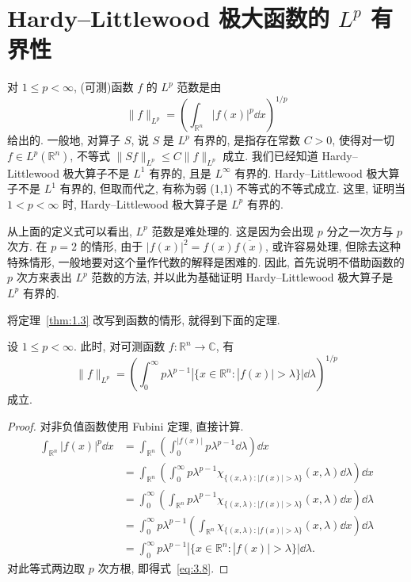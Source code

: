 
\section{\texorpdfstring{Hardy--Littlewood 极大函数的 $L^{p}$ 有界性}{Hardy-Littlewood 极大函数的 Lp 有界性}}\label{sec:3.2}


对 $1 \leq p < \infty$, (可测)函数 $f$ 的 $L^{p}$ 范数是由
\[
\|f\|_{L^{p}} = \left(\int_{\mathbb{R}^{n}}|f(x)|^{p}\dd x\right)^{1/p}
\]
给出的. 一般地, 对算子 $S$, 说 $S$ 是 $L^{p}$ 有界的, 是指存在常数 $C > 0$, 使得对一切 $f \in L^{p}(\mathbb{R}^{n})$, 不等式 $\|Sf\|_{L^{p}} \leq C\|f\|_{L^{p}}$ 成立. 我们已经知道 Hardy--Littlewood 极大算子不是 $L^{1}$ 有界的, 且是 $L^{\infty}$ 有界的. Hardy--Littlewood 极大算子不是 $L^{1}$ 有界的, 但取而代之, 有称为弱 (1,1) 不等式的不等式成立. 这里, 证明当 $1 < p < \infty$ 时, Hardy--Littlewood 极大算子是 $L^{p}$ 有界的.

从上面的定义式可以看出, $L^{p}$ 范数是难处理的. 这是因为会出现 $p$ 分之一次方与 $p$ 次方. 在 $p = 2$ 的情形, 由于 $|f(x)|^{2} = f(x)\overline{f(x)}$, 或许容易处理, 但除去这种特殊情形, 一般地要对这个量作代数的解释是困难的. 因此, 首先说明不借助函数的 $p$ 次方来表出 $L^{p}$ 范数的方法, 并以此为基础证明 Hardy--Littlewood 极大算子是 $L^{p}$ 有界的.

将定理~\ref{thm:1.3} 改写到函数的情形, 就得到下面的定理.

\begin{theorem}\label{thm:3.3}
设 $1 \leq p < \infty$. 此时, 对可测函数 $f: \mathbb{R}^{n} \to \mathbb{C}$, 有
\begin{equation}\tag{3.8}
\|f\|_{L^{p}} = \left(\int_{0}^{\infty}p\lambda^{p-1}|\{x \in \mathbb{R}^{n}: |f(x)| > \lambda\}|\dd\lambda\right)^{1/p}
\label{eq:3.8}
\end{equation}
成立.
\end{theorem}

\begin{proof}
对非负值函数使用 Fubini 定理, 直接计算.
\begin{align*}
\int_{\mathbb{R}^{n}}|f(x)|^{p}\dd x &= \int_{\mathbb{R}^{n}}\left(\int_{0}^{|f(x)|}p\lambda^{p-1}\dd\lambda\right)\dd x \\
&= \int_{\mathbb{R}^{n}}\left(\int_{0}^{\infty}p\lambda^{p-1}\chi_{\{(x,\lambda): |f(x)| > \lambda\}}(x,\lambda)\dd\lambda\right)\dd x \\
&= \int_{0}^{\infty}\left(\int_{\mathbb{R}^{n}}p\lambda^{p-1}\chi_{\{(x,\lambda): |f(x)| > \lambda\}}(x,\lambda)\dd x\right)\dd\lambda \\
&= \int_{0}^{\infty}p\lambda^{p-1}\left(\int_{\mathbb{R}^{n}}\chi_{\{(x,\lambda): |f(x)| > \lambda\}}(x,\lambda)\dd x\right)\dd\lambda \\
&= \int_{0}^{\infty}p\lambda^{p-1}|\{x \in \mathbb{R}^{n}: |f(x)| > \lambda\}|\dd\lambda.
\end{align*}
对此等式两边取 $p$ 次方根, 即得式~\eqref{eq:3.8}.
\end{proof}

